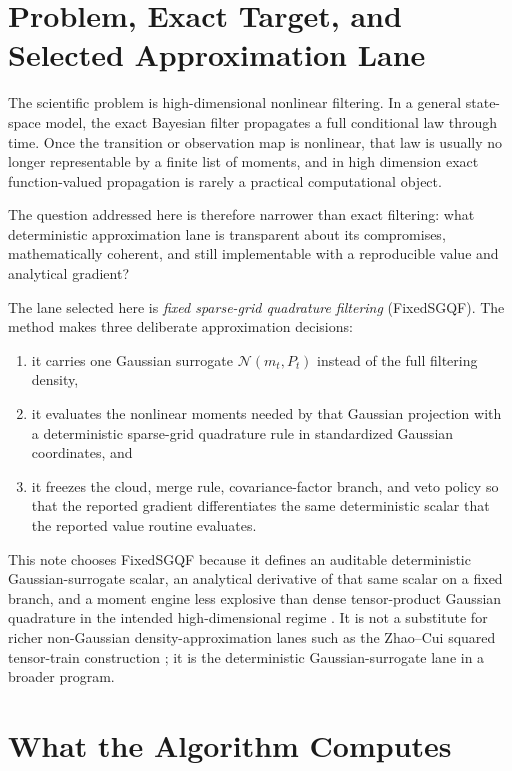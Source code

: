 \documentclass[11pt]{article}
\numberwithin{equation}{section}
\newcommand{\N}{\mathcal N}
\begin{document}
\section{Problem, Exact Target, and Selected Approximation Lane}
\label{sec:problem-and-lane}

The scientific problem is high-dimensional nonlinear filtering.  In a general
state-space model, the exact Bayesian filter propagates a full conditional law
through time.  Once the transition or observation map is nonlinear, that law is
usually no longer representable by a finite list of moments, and in high
dimension exact function-valued propagation is rarely a practical computational
object.

The question addressed here is therefore narrower than exact filtering: what
deterministic approximation lane is transparent about its compromises,
mathematically coherent, and still implementable with a reproducible value and
analytical gradient?

The lane selected here is \emph{fixed sparse-grid quadrature filtering}
(FixedSGQF).  The method makes three deliberate approximation decisions:
\begin{enumerate}[leftmargin=0.3in]
  \item it carries one Gaussian surrogate \(\N(m_t,P_t)\) instead of the full
  filtering density,
  \item it evaluates the nonlinear moments needed by that Gaussian projection
  with a deterministic sparse-grid quadrature rule in standardized Gaussian
  coordinates, and
  \item it freezes the cloud, merge rule, covariance-factor branch, and veto
  policy so that the reported gradient differentiates the same deterministic
  scalar that the reported value routine evaluates.
\end{enumerate}

This note chooses FixedSGQF because it defines an auditable deterministic
Gaussian-surrogate scalar, an analytical derivative of that same scalar on a
fixed branch, and a moment engine less explosive than dense tensor-product
Gaussian quadrature in the intended high-dimensional regime
\cite{jia2012sparsegrid,singh2018adaptive}.  It is not a substitute for richer
non-Gaussian density-approximation lanes such as the Zhao--Cui squared
tensor-train construction \cite{zhao2024ttsequential}; it is the deterministic
Gaussian-surrogate lane in a broader program.

\section{What the Algorithm Computes}
\label{sec:what-computes}
\end{document}
